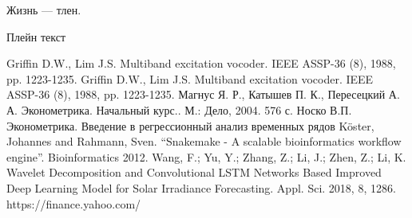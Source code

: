 \documentclass[a4paper,article,14pt]{extarticle}
\begin{document}
Жизнь --- тлен.
\pagebreak


Плейн текст

\begin{thebibliography}{1}
 Griffin D.W., Lim J.S. \flqq Multiband excitation vocoder\frqq. IEEE ASSP-36 (8), 1988, pp. 1223-1235.
 Griffin D.W., Lim J.S. \flqq Multiband excitation vocoder\frqq. IEEE ASSP-36 (8), 1988, pp. 1223-1235.
 Магнус Я. Р., Катышев П. К., Пересецкий А. А. Эконометрика. Начальный курс.. М.: Дело, 2004. 576 с.
 Носко В.П. Эконометрика. Введение в регрессионный анализ временных рядов
 Köster, Johannes and Rahmann, Sven. “Snakemake - A scalable bioinformatics workflow engine”. Bioinformatics 2012.
 Wang, F.; Yu, Y.; Zhang, Z.; Li, J.; Zhen, Z.; Li, K. Wavelet Decomposition and Convolutional LSTM Networks Based Improved Deep Learning Model for Solar Irradiance Forecasting. Appl. Sci. 2018, 8, 1286.
 https://finance.yahoo.com/
\end{thebibliography}
\end{document}
